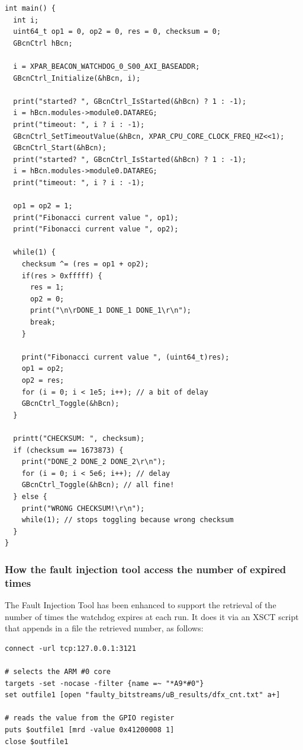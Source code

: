 \begin{lstlisting}[style=C]
int main() {
  int i;
  uint64_t op1 = 0, op2 = 0, res = 0, checksum = 0;
  GBcnCtrl hBcn;

  i = XPAR_BEACON_WATCHDOG_0_S00_AXI_BASEADDR;
  GBcnCtrl_Initialize(&hBcn, i);

  print("started? ", GBcnCtrl_IsStarted(&hBcn) ? 1 : -1);
  i = hBcn.modules->module0.DATAREG;
  print("timeout: ", i ? i : -1);
  GBcnCtrl_SetTimeoutValue(&hBcn, XPAR_CPU_CORE_CLOCK_FREQ_HZ<<1);
  GBcnCtrl_Start(&hBcn);
  print("started? ", GBcnCtrl_IsStarted(&hBcn) ? 1 : -1);
  i = hBcn.modules->module0.DATAREG;
  print("timeout: ", i ? i : -1);

  op1 = op2 = 1;
  print("Fibonacci current value ", op1);
  print("Fibonacci current value ", op2);

  while(1) {
    checksum ^= (res = op1 + op2);
    if(res > 0xfffff) {
  	  res = 1;
  	  op2 = 0;
  	  print("\n\rDONE_1 DONE_1 DONE_1\r\n");
  	  break;
    }

    print("Fibonacci current value ", (uint64_t)res);
    op1 = op2;
    op2 = res;
    for (i = 0; i < 1e5; i++); // a bit of delay
    GBcnCtrl_Toggle(&hBcn);
  }

  printt("CHECKSUM: ", checksum);
  if (checksum == 1673873) {
    print("DONE_2 DONE_2 DONE_2\r\n");
    for (i = 0; i < 5e6; i++); // delay
    GBcnCtrl_Toggle(&hBcn); // all fine!
  } else {
    print("WRONG CHECKSUM!\r\n");
    while(1); // stops toggling because wrong checksum
  }
}
\end{lstlisting}

\subsubsection{How the fault injection tool access the number of expired times}

The Fault Injection Tool has been enhanced to support the retrieval of the number of times the watchdog expires at each run. It does it via an XSCT script that appends in a file the retrieved number, as follows:\bigskip

\begin{lstlisting}[style=tcl]
connect -url tcp:127.0.0.1:3121

# selects the ARM #0 core
targets -set -nocase -filter {name =~ "*A9*#0"} 
set outfile1 [open "faulty_bitstreams/uB_results/dfx_cnt.txt" a+]    

# reads the value from the GPIO register
puts $outfile1 [mrd -value 0x41200008 1] 
close $outfile1
\end{lstlisting}

